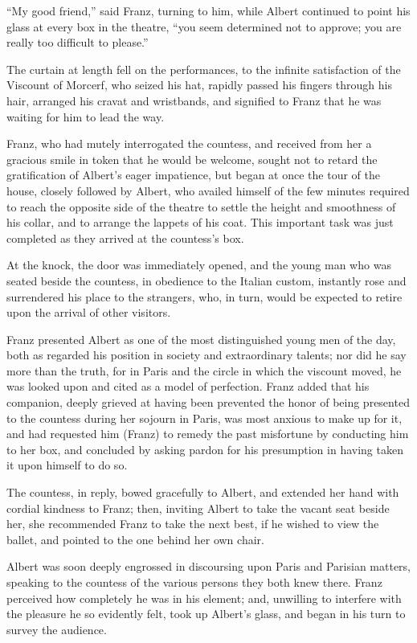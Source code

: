 “My good friend,” said Franz, turning to him, while Albert continued to
point his glass at every box in the theatre, “you seem determined not
to approve; you are really too difficult to please.”

The curtain at length fell on the performances, to the infinite
satisfaction of the Viscount of Morcerf, who seized his hat, rapidly
passed his fingers through his hair, arranged his cravat and
wristbands, and signified to Franz that he was waiting for him to lead
the way.

Franz, who had mutely interrogated the countess, and received from her
a gracious smile in token that he would be welcome, sought not to
retard the gratification of Albert’s eager impatience, but began at
once the tour of the house, closely followed by Albert, who availed
himself of the few minutes required to reach the opposite side of the
theatre to settle the height and smoothness of his collar, and to
arrange the lappets of his coat. This important task was just completed
as they arrived at the countess’s box.

At the knock, the door was immediately opened, and the young man who
was seated beside the countess, in obedience to the Italian custom,
instantly rose and surrendered his place to the strangers, who, in
turn, would be expected to retire upon the arrival of other visitors.

Franz presented Albert as one of the most distinguished young men of
the day, both as regarded his position in society and extraordinary
talents; nor did he say more than the truth, for in Paris and the
circle in which the viscount moved, he was looked upon and cited as a
model of perfection. Franz added that his companion, deeply grieved at
having been prevented the honor of being presented to the countess
during her sojourn in Paris, was most anxious to make up for it, and
had requested him (Franz) to remedy the past misfortune by conducting
him to her box, and concluded by asking pardon for his presumption in
having taken it upon himself to do so.

The countess, in reply, bowed gracefully to Albert, and extended her
hand with cordial kindness to Franz; then, inviting Albert to take the
vacant seat beside her, she recommended Franz to take the next best, if
he wished to view the ballet, and pointed to the one behind her own
chair.

Albert was soon deeply engrossed in discoursing upon Paris and Parisian
matters, speaking to the countess of the various persons they both knew
there. Franz perceived how completely he was in his element; and,
unwilling to interfere with the pleasure he so evidently felt, took up
Albert’s glass, and began in his turn to survey the audience.

